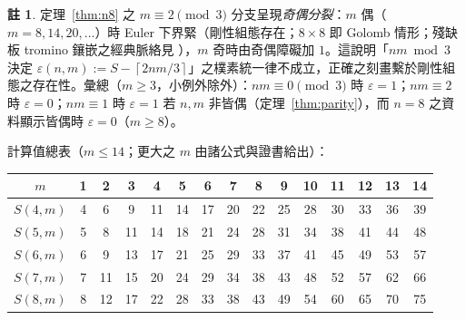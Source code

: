 \documentclass[11pt]{ctexart}
\theoremstyle{definition}
\newtheorem{remark}[theorem]{註}
\newcommand{\ceil}[1]{\left\lceil #1 \right\rceil}
\begin{document}
\begin{remark}
定理~\ref{thm:n8} 之 $m\equiv2\pmod3$ 分支呈現\emph{奇偶分裂}：$m$ 偶（$m=8,14,20,\dots$）時 Euler 下界緊（剛性組態存在；$8\times8$ 即 Golomb 情形；殘缺板 tromino 鑲嵌之經典脈絡見 \cite{CJ86}），$m$ 奇時由奇偶障礙加 $1$。這說明「$nm\bmod3$ 決定 $\varepsilon(n,m):=S-\ceil{2nm/3}$」之樸素統一律不成立，正確之刻畫繫於剛性組態之存在性。彙總（$m\ge3$，小例外除外）：$nm\equiv0\pmod3$ 時 $\varepsilon=1$；$nm\equiv2$ 時 $\varepsilon=0$；$nm\equiv1$ 時 $\varepsilon=1$ 若 $n,m$ 非皆偶（定理~\ref{thm:parity}），而 $n=8$ 之資料顯示皆偶時 $\varepsilon=0$（$m\ge8$）。
\end{remark}

計算值總表（$m\le 14$；更大之 $m$ 由諸公式與證書給出）：
\begin{center}\small
\begin{tabular}{c|cccccccccccccc}
\toprule
$m$ & 1&2&3&4&5&6&7&8&9&10&11&12&13&14\\
\midrule
$S(4,m)$ & 4&6&9&11&14&17&$20$&22&25&$28$&30&33&$36$&$39$\\
$S(5,m)$ & 5&8&11&14&18&21&24&28&31&34&38&41&44&48\\
$S(6,m)$ & 6&9&13&17&21&25&29&33&37&41&45&49&53&57\\
$S(7,m)$ & 7&11&15&20&24&29&34&38&43&48&52&57&62&66\\
$S(8,m)$ & 8&12&17&22&28&33&38&43&49&54&60&65&70&75\\
\bottomrule
\end{tabular}
\end{center}
\end{document}
